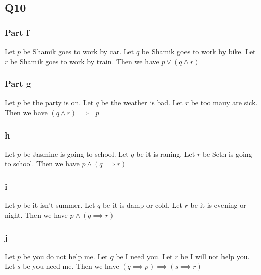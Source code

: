 \documentclass[12pt]{article}
\begin{document}
\subsection{Q10}
\subsubsection{Part f}
Let $p$ be Shamik goes to work by car.
\newline
Let $q$ be Shamik goes to work by bike.
\newline
Let $r$ be Shamik goes to work by train.
\newline
Then we have $p \lor (q \land r)$

\subsubsection{Part g}
Let $p$ be the party is on.
\newline
Let $q$ be the weather is bad.
\newline
Let $r$ be too many are sick.
\newline
Then we have $(q \land r) \implies \neg p$

\subsubsection{h}
Let $p$ be Jasmine is going to school.
\newline
Let $q$ be it is raning.
\newline
Let $r$ be Seth is going to school.
\newline
Then we have $p \land (q \implies r)$

\subsubsection{i}
Let $p$ be it isn't summer.
\newline
Let $q$ be it is damp or cold.
\newline
Let $r$ be it is evening or night.
\newline
Then we have $p \land (q \implies r)$

\subsubsection{j}
Let $p$ be you do not help me.
\newline
Let $q$ be I need you.
\newline
Let $r$ be I will not help you.
\newline
Let $s$ be you need me.
\newline
Then we have $(q \implies p) \implies (s \implies r)$
\end{document}
